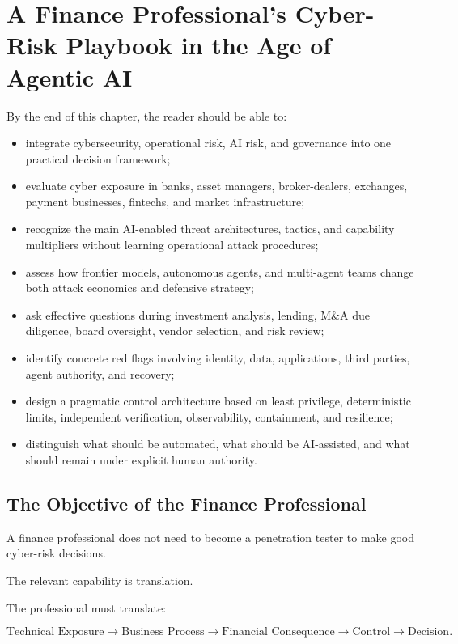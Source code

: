 \chapter{A Finance Professional's Cyber-Risk Playbook in the Age of Agentic AI}

\begin{learningobjectives}
By the end of this chapter, the reader should be able to:
\begin{itemize}
    \item integrate cybersecurity, operational risk, AI risk, and governance into one practical decision framework;
    \item evaluate cyber exposure in banks, asset managers, broker-dealers, exchanges, payment businesses, fintechs, and market infrastructure;
    \item recognize the main AI-enabled threat architectures, tactics, and capability multipliers without learning operational attack procedures;
    \item assess how frontier models, autonomous agents, and multi-agent teams change both attack economics and defensive strategy;
    \item ask effective questions during investment analysis, lending, M\&A due diligence, board oversight, vendor selection, and risk review;
    \item identify concrete red flags involving identity, data, applications, third parties, agent authority, and recovery;
    \item design a pragmatic control architecture based on least privilege, deterministic limits, independent verification, observability, containment, and resilience;
    \item distinguish what should be automated, what should be AI-assisted, and what should remain under explicit human authority.
\end{itemize}
\end{learningobjectives}

\section{The Objective of the Finance Professional}

A finance professional does not need to become a penetration tester to make good cyber-risk decisions.

The relevant capability is translation.

The professional must translate:

\begin{equation}
\text{Technical Exposure}
\rightarrow
\text{Business Process}
\rightarrow
\text{Financial Consequence}
\rightarrow
\text{Control}
\rightarrow
\text{Decision}.
\end{equation}

